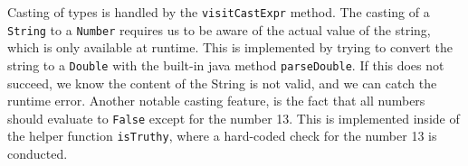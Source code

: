 Casting of types is handled by the \verb|visitCastExpr| method. The casting of a \verb|String| to a \verb|Number| requires us to be aware of the actual value of the string, which is only available at runtime. This is implemented by trying to convert the string to a \verb|Double| with the built-in java method \verb|parseDouble|. If this does not succeed, we know the content of the String is not valid, and we can catch the runtime error.
Another notable casting feature, is the fact that all numbers should evaluate to \verb|False| except for the number 13. This is implemented inside of the helper function \verb|isTruthy|, where a hard-coded check for the number 13 is conducted.

